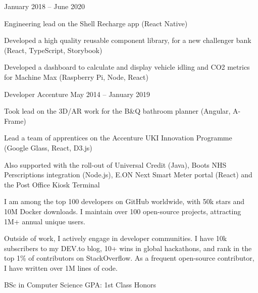 \documentclass[]{awesome-cv}
\begin{document}
\begin{cventries}
    { January 2018 – June 2020 }
    {\begin{cvitems}
        \item { Engineering lead on the Shell Recharge app (React Native) }
        \item { Developed a high quality reusable component library, for a new challenger bank (React, TypeScript, Storybook) }
        \item { Developed a dashboard to calculate and display vehicle idling and CO2 metrics for Machine Max (Raspberry Pi, Node, React) }
    \end{cvitems}}
    \cventry
    { Developer }
    { Accenture }
    {}
    { May 2014 – January 2019 }
    {\begin{cvitems}
        \item { Took lead on the 3D/AR work for the B\&Q bathroom planner (Angular, A-Frame) }
        \item { Lead a team of apprentices on the Accenture UKI Innovation Programme (Google Glass, React, D3.js) }
        \item { Also supported with the roll-out of Universal Credit (Java), Boots NHS Perscriptions integration (Node.js), E.ON Next Smart Meter portal (React) and the Post Office Kiosk Terminal }
    \end{cvitems}}
\end{cventries}



\begin{cvachievements}
    \item { I am among the top 100 developers on GitHub worldwide, with 50k stars and 10M Docker downloads. I maintain over 100 open-source projects, attracting 1M+ annual unique users. }
    \item { Outside of work, I actively engage in developer communities. I have 10k subscribers to my DEV.to blog, 10+ wins in global hackathons, and rank in the top 1\% of contributors on StackOverflow. As a frequent open-source contributor, I have written over 1M lines of code. }
\end{cvachievements}



\begin{cventries}
    \cventry
    { BSc in Computer Science }
    {  }
    {}
    {}
    {GPA: 1st Class Honors}
\end{cventries}
\end{document}
